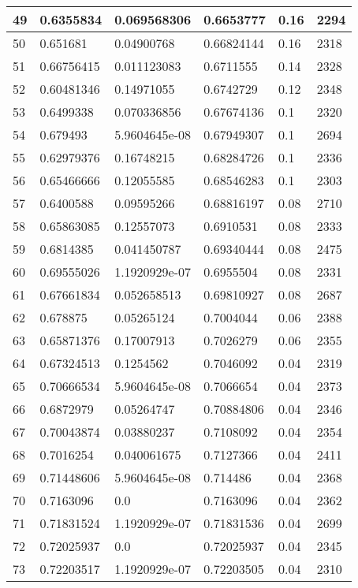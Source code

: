 \begin{longtable}{|l|l|l|l|l|l|}
49 & 0.6355834 & 0.069568306 & 0.6653777 & 0.16 & 2294 \\ \hline 
50 & 0.651681 & 0.04900768 & 0.66824144 & 0.16 & 2318 \\ \hline 
51 & 0.66756415 & 0.011123083 & 0.6711555 & 0.14 & 2328 \\ \hline 
52 & 0.60481346 & 0.14971055 & 0.6742729 & 0.12 & 2348 \\ \hline 
53 & 0.6499338 & 0.070336856 & 0.67674136 & 0.1 & 2320 \\ \hline 
54 & 0.679493 & 5.9604645e-08 & 0.67949307 & 0.1 & 2694 \\ \hline 
55 & 0.62979376 & 0.16748215 & 0.68284726 & 0.1 & 2336 \\ \hline 
56 & 0.65466666 & 0.12055585 & 0.68546283 & 0.1 & 2303 \\ \hline 
57 & 0.6400588 & 0.09595266 & 0.68816197 & 0.08 & 2710 \\ \hline 
58 & 0.65863085 & 0.12557073 & 0.6910531 & 0.08 & 2333 \\ \hline 
59 & 0.6814385 & 0.041450787 & 0.69340444 & 0.08 & 2475 \\ \hline 
60 & 0.69555026 & 1.1920929e-07 & 0.6955504 & 0.08 & 2331 \\ \hline 
61 & 0.67661834 & 0.052658513 & 0.69810927 & 0.08 & 2687 \\ \hline 
62 & 0.678875 & 0.05265124 & 0.7004044 & 0.06 & 2388 \\ \hline 
63 & 0.65871376 & 0.17007913 & 0.7026279 & 0.06 & 2355 \\ \hline 
64 & 0.67324513 & 0.1254562 & 0.7046092 & 0.04 & 2319 \\ \hline 
65 & 0.70666534 & 5.9604645e-08 & 0.7066654 & 0.04 & 2373 \\ \hline 
66 & 0.6872979 & 0.05264747 & 0.70884806 & 0.04 & 2346 \\ \hline 
67 & 0.70043874 & 0.03880237 & 0.7108092 & 0.04 & 2354 \\ \hline 
68 & 0.7016254 & 0.040061675 & 0.7127366 & 0.04 & 2411 \\ \hline 
69 & 0.71448606 & 5.9604645e-08 & 0.714486 & 0.04 & 2368 \\ \hline 
70 & 0.7163096 & 0.0 & 0.7163096 & 0.04 & 2362 \\ \hline 
71 & 0.71831524 & 1.1920929e-07 & 0.71831536 & 0.04 & 2699 \\ \hline 
72 & 0.72025937 & 0.0 & 0.72025937 & 0.04 & 2345 \\ \hline 
73 & 0.72203517 & 1.1920929e-07 & 0.72203505 & 0.04 & 2310 \\ \hline 

\end{longtable}

